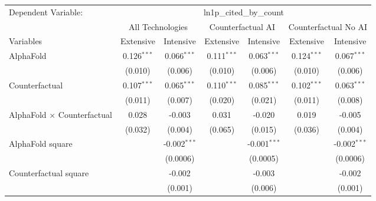 \begingroup
\centering
\begin{tabular}{lcccccc}
   \tabularnewline \midrule \midrule
   Dependent Variable: & \multicolumn{6}{c}{ln1p\_cited\_by\_count}\\
 & \multicolumn{2}{c}{All Technologies} & \multicolumn{2}{c}{Counterfactual AI} & \multicolumn{2}{c}{Counterfactual No AI} \\
\cmidrule(lr){1-1}\cmidrule(lr){2-3} \cmidrule(lr){4-5} \cmidrule(lr){6-7}
Variables & \multicolumn{1}{c}{Extensive} & \multicolumn{1}{c}{Intensive} & \multicolumn{1}{c}{Extensive} & \multicolumn{1}{c}{Intensive} & \multicolumn{1}{c}{Extensive} & \multicolumn{1}{c}{Intensive} \\
\cmidrule(lr){1-1}\cmidrule(lr){2-2} \cmidrule(lr){3-3} \cmidrule(lr){4-4} \cmidrule(lr){5-5} \cmidrule(lr){6-6} \cmidrule(lr){7-7}
   AlphaFold                          & 0.126$^{***}$ & 0.066$^{***}$  & 0.111$^{***}$ & 0.063$^{***}$  & 0.124$^{***}$ & 0.067$^{***}$\\   
                                      & (0.010)       & (0.006)        & (0.010)       & (0.006)        & (0.010)       & (0.006)\\   
   Counterfactual                     & 0.107$^{***}$ & 0.065$^{***}$  & 0.110$^{***}$ & 0.085$^{***}$  & 0.102$^{***}$ & 0.063$^{***}$\\   
                                      & (0.011)       & (0.007)        & (0.020)       & (0.021)        & (0.011)       & (0.008)\\   
   AlphaFold $\times$ Counterfactual  & 0.028         & -0.003         & 0.031         & -0.020         & 0.019         & -0.005\\   
                                      & (0.032)       & (0.004)        & (0.065)       & (0.015)        & (0.036)       & (0.004)\\   
   AlphaFold square                   &               & -0.002$^{***}$ &               & -0.001$^{***}$ &               & -0.002$^{***}$\\   
                                      &               & (0.0006)       &               & (0.0005)       &               & (0.0006)\\   
   Counterfactual square              &               & -0.002         &               & -0.003         &               & -0.002\\   
                                      &               & (0.001)        &               & (0.006)        &               & (0.001)\\   

\end{tabular}
